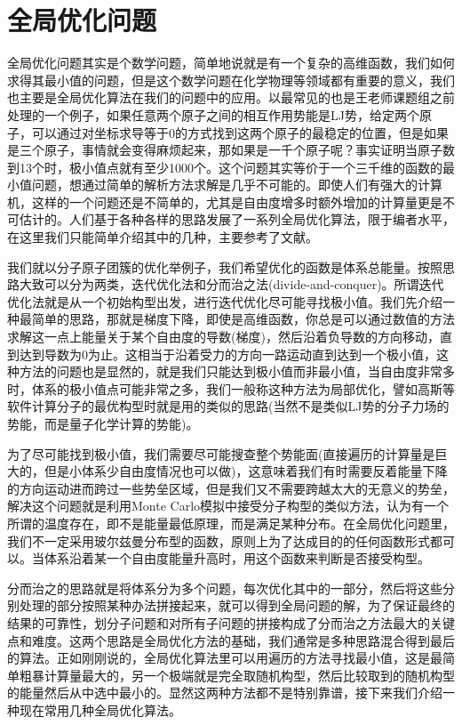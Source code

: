 \documentclass[12pt,a4paper,openany,twoside]{book}
\numberwithin{equation}{section}
\begin{document}
    \chapter{全局优化问题}
      全局优化问题其实是个数学问题，简单地说就是有一个复杂的高维函数，我们如何求得其最小值的问题，但是这个数学问题在化学物理等领域都有重要的意义，我们也主要是全局优化算法在我们的问题中的应用。以最常见的也是王老师课题组之前处理的一个例子，如果任意两个原子之间的相互作用势能是LJ势，给定两个原子，可以通过对坐标求导等于0的方式找到这两个原子的最稳定的位置，但是如果是三个原子，事情就会变得麻烦起来，那如果是一千个原子呢？事实证明当原子数到13个时，极小值点就有至少1000个。这个问题其实等价于一个三千维的函数的最小值问题，想通过简单的解析方法求解是几乎不可能的。即使人们有强大的计算机，这样的一个问题还是不简单的，尤其是自由度增多时额外增加的计算量更是不可估计的。人们基于各种各样的思路发展了一系列全局优化算法，限于编者水平，在这里我们只能简单介绍其中的几种，主要参考了文献\cite{Kaplan2006}\cite{卡普兰2013分子间相互作用}。

      我们就以分子原子团簇的优化举例子，我们希望优化的函数是体系总能量。按照思路大致可以分为两类，迭代优化法和分而治之法(divide-and-conquer)。所谓迭代优化法就是从一个初始构型出发，进行迭代优化尽可能寻找极小值。我们先介绍一种最简单的思路，那就是梯度下降，即使是高维函数，你总是可以通过数值的方法求解这一点上能量关于某个自由度的导数(梯度)，然后沿着负导数的方向移动，直到达到导数为0为止。这相当于沿着受力的方向一路运动直到达到一个极小值，这种方法的问题也是显然的，就是我们只能达到极小值而非最小值，当自由度非常多时，体系的极小值点可能非常之多，我们一般称这种方法为局部优化，譬如高斯等软件计算分子的最优构型时就是用的类似的思路(当然不是类似LJ势的分子力场的势能，而是量子化学计算的势能)。

      为了尽可能找到极小值，我们需要尽可能搜查整个势能面(直接遍历的计算量是巨大的，但是小体系少自由度情况也可以做)，这意味着我们有时需要反着能量下降的方向运动进而跨过一些势垒区域，但是我们又不需要跨越太大的无意义的势垒，解决这个问题就是利用Monte Carlo模拟中接受分子构型的类似方法，认为有一个所谓的温度存在，即不是能量最低原理，而是满足某种分布。在全局优化问题里，我们不一定采用玻尔兹曼分布型的函数，原则上为了达成目的的任何函数形式都可以。当体系沿着某一个自由度能量升高时，用这个函数来判断是否接受构型。

      分而治之的思路就是将体系分为多个问题，每次优化其中的一部分，然后将这些分别处理的部分按照某种办法拼接起来，就可以得到全局问题的解，为了保证最终的结果的可靠性，划分子问题和对所有子问题的拼接构成了分而治之方法最大的关键点和难度。这两个思路是全局优化方法的基础，我们通常是多种思路混合得到最后的算法。正如刚刚说的，全局优化算法里可以用遍历的方法寻找最小值，这是最简单粗暴计算量最大的，另一个极端就是完全取随机构型，然后比较取到的随机构型的能量然后从中选中最小的。显然这两种方法都不是特别靠谱，接下来我们介绍一种现在常用几种全局优化算法。
      
\end{document}
